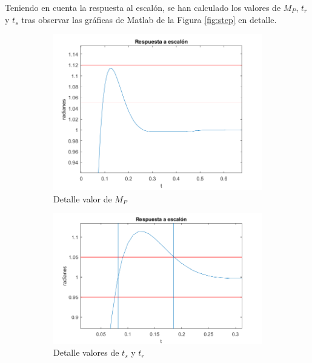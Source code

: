 \documentclass[a4paper]{article}
\begin{document}
Teniendo en cuenta la respuesta al escalón, se han calculado los valores de $M_P$, $t_r$ y $t_s$ tras observar las gráficas de Matlab de la Figura \ref{fig:step} en detalle. 

\begin{center}
	\begin{figure}[htp]
		\begin{subfigure}{1\textwidth}
			\centering
			\includegraphics[width=12cm]{escalon_Mp2}
			\caption{Detalle valor de $M_P$}
			\label{mp}
		\end{subfigure}
		
		\begin{subfigure}{1\textwidth}
			\centering
			\includegraphics[width=12cm]{escalon_ts_tr2}
			\caption{Detalle valores de $t_s$ y $t_r$}
			\label{fig:tr}
		\end{subfigure}
		\caption{}
		\label{fig:escalon}
	\end{figure}
\end{center}
\end{document}
